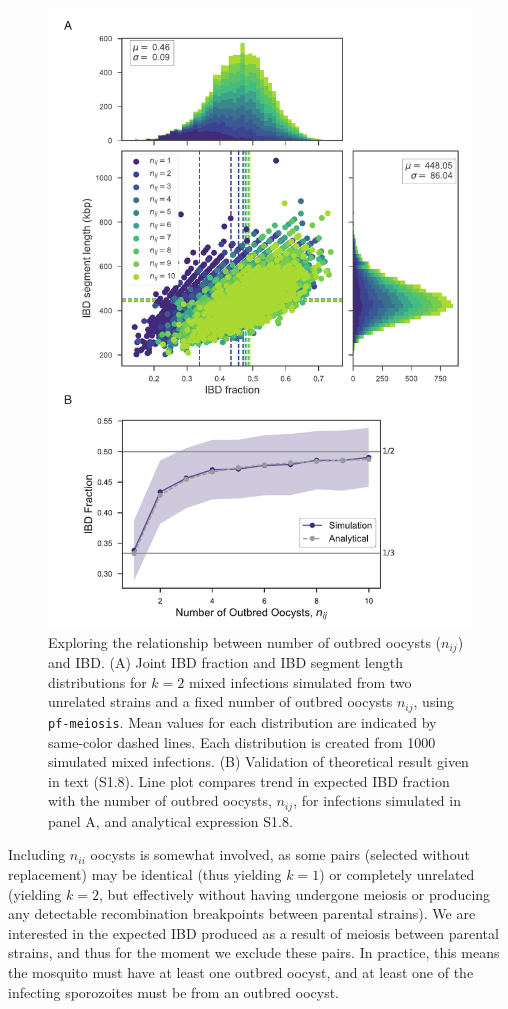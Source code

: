 \documentclass[9pt]{article}
\begin{document}
\begin{figure}[pt]
  \centering{}
  \includegraphics[width = .85\textwidth]{supFigures/supp-Fig1.pdf}
  \caption{Exploring the relationship between number of outbred oocysts ($n_{ij}$) and IBD. (A) Joint IBD fraction and IBD segment length distributions for $k=2$ mixed infections simulated from two unrelated strains and a fixed number of outbred oocysts $n_{ij}$, using \texttt{pf-meiosis}. Mean values for each distribution are indicated by same-color dashed lines. Each distribution is created from 1000 simulated mixed infections. (B) Validation of theoretical result given in text (S1.8). Line plot compares trend in expected IBD fraction with the number of outbred oocysts, $n_{ij}$, for infections simulated in panel A, and analytical expression S1.8.} \label{fig:validoocyst}
\end{figure}

Including $n_{ii}$ oocysts is somewhat involved, as some pairs (selected without replacement) may be identical (thus yielding $k=1$) or completely unrelated (yielding $k=2$, but effectively without having undergone meiosis or producing any detectable recombination breakpoints between parental strains).  We are interested in the expected IBD produced as a result of meiosis between parental strains, and thus for the moment we exclude these pairs. In practice, this means the mosquito must have at least one outbred oocyst, and at least one of the infecting sporozoites must be from an outbred oocyst.
\end{document}
